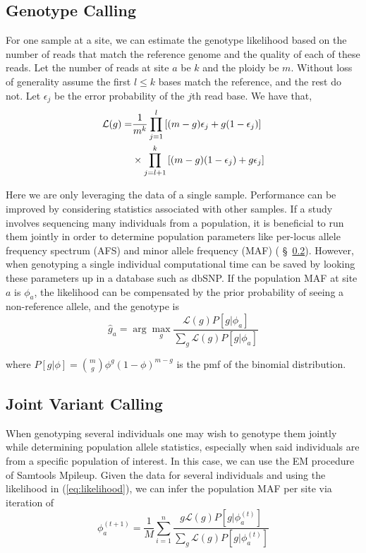 \documentclass{acm_proc_article-sp}
\begin{document}
\subsection{Genotype Calling}
\label{sec:snp-calling}

For one sample at a site, we can estimate the genotype likelihood based on the number of reads that match the
reference genome and the quality of each of these reads. Let the number of reads at site $a$ be $k$ and the ploidy be $m$. Without
loss of generality assume the first $l\leq k$ bases match the reference, and the rest do not. Let $\epsilon_j$ be the
error probability of the $j$th read base. We have that,
\begin{align}
\mathcal{L}(g) =& \frac{1}{m^k} \prod_{j=1}^l \left[ (m-g)\epsilon_j + g( 1 - \epsilon_j )\right] \notag\\
&\times\prod_{j=l+1}^k \left[(m-g)(1-\epsilon_j) + g\epsilon_j \right]
\label{eq:likelihood}
\end{align}

Here we are only leveraging the data of a single sample. Performance can be improved by considering statistics associated
with other samples. If a study involves sequencing many individuals from a population, it is beneficial to run them jointly in order
to determine population parameters like per-locus allele frequency spectrum (AFS) and minor allele frequency (MAF)
( \S~\ref{sec:joint-variant-calling}). However, when genotyping a single individual computational time can be saved by looking
these parameters up in a database such as dbSNP. If the population MAF at site $a$ is $\phi_a$, the likelihood can be
compensated by the prior probability of seeing a non-reference allele, and the genotype is
\begin{equation}
\hat{g}_{a} = \arg\max_g \frac{\mathcal{L}(g)P[g|\phi_a]}{\sum_g \mathcal{L}(g)P[g|\phi_a]}
\end{equation}

where $P[g|\phi] = {m\choose g} \phi^g (1-\phi)^{m-g}$ is the pmf of the binomial distribution.

\subsection{Joint Variant Calling}
\label{sec:joint-variant-calling}
When genotyping several individuals one may wish to genotype them jointly while determining population allele statistics,
 especially when said individuals are from a specific population of interest. In this case, we can use the EM procedure of
 Samtools Mpileup. Given the data for several individuals and using the likelihood in (\ref{eq:likelihood}), we can
 infer the population MAF per site via iteration of
 \begin{equation}
 \phi_a^{(t+1)} = \frac{1}{M}\sum_{i=1}^n\frac{g\mathcal{L}(g)P[g | \phi_a^{(t)}] }{ \sum_g \mathcal{L}(g)P[g | \phi_a^{(t)}]}
 \end{equation}
 
\end{document}
